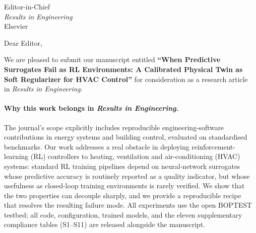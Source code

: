 \documentclass[11pt,a4paper]{letter}
\date{\today}
\begin{document}
\begin{letter}{Editor-in-Chief \\
               \textit{Results in Engineering} \\
               Elsevier}

\opening{Dear Editor,}

We are pleased to submit our manuscript entitled
\textbf{``When Predictive Surrogates Fail as RL Environments: A
Calibrated Physical Twin as Soft Regularizer for HVAC Control''}
for consideration as a research article in \textit{Results in
Engineering}.

\paragraph{Why this work belongs in \textit{Results in Engineering}.}
The journal's scope explicitly includes reproducible
engineering-software contributions in energy systems and building
control, evaluated on standardised benchmarks. Our work addresses a
real obstacle in deploying reinforcement-learning (RL) controllers to
heating, ventilation and air-conditioning (HVAC) systems: standard
RL training pipelines depend on neural-network surrogates whose
predictive accuracy is routinely reported as a quality indicator, but
whose usefulness as closed-loop training environments is rarely
verified. We show that the two properties can decouple sharply, and
we provide a reproducible recipe that resolves the resulting failure
mode. All experiments use the open BOPTEST testbed; all code,
configuration, trained models, and the eleven supplementary
compliance tables (S1--S11) are released alongside the manuscript.


\end{letter}
\end{document}
